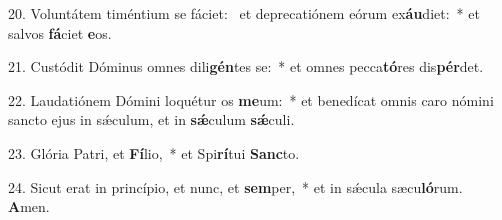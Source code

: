 20. Voluntátem timéntium se fáciet: \dag\  et deprecatiónem eórum ex\textbf{áu}diet:~*  et salvos \textbf{fá}ciet \textbf{e}os.\

21. Custódit Dóminus omnes dili\textbf{gén}tes se:~*  et omnes pecca\textbf{tó}res dis\textbf{pér}det.\

22. Laudatiónem Dómini loquétur os \textbf{me}um:~*  et benedícat omnis caro nómini sancto ejus in sǽculum, et in \textbf{sǽ}culum \textbf{sǽ}culi.\

23. Glória Patri, et \textbf{Fí}lio,~*  et Spi\textbf{rí}tui \textbf{Sanc}to.\

24. Sicut erat in princípio, et nunc, et \textbf{sem}per,~*  et in sǽcula sæcu\textbf{ló}rum. \textbf{A}men.\

